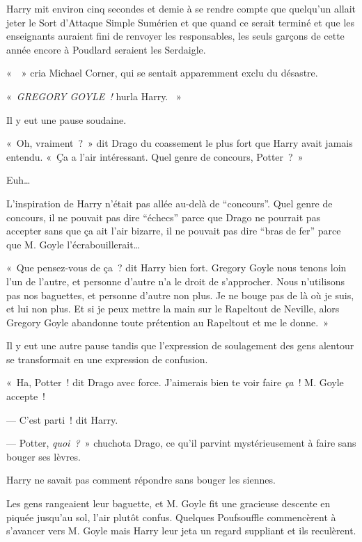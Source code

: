 Harry mit environ cinq secondes et demie à se rendre compte que quelqu'un allait jeter le Sort d'Attaque Simple Sumérien et que quand ce serait terminé et que les enseignants auraient fini de renvoyer les responsables, les seuls garçons de cette année encore à Poudlard seraient les Serdaigle.

«~~» cria Michael Corner, qui se sentait apparemment exclu du désastre.

«~\emph{GREGORY GOYLE~!} hurla Harry. ~»

Il y eut une pause soudaine.

«~Oh, vraiment~?~» dit Drago du coassement le plus fort que Harry avait jamais entendu. «~Ça a l'air intéressant. Quel genre de concours, Potter~?~»

Euh…

L'inspiration de Harry n'était pas allée au-delà de “concours”. Quel genre de concours, il ne pouvait pas dire “échecs” parce que Drago ne pourrait pas accepter sans que ça ait l'air bizarre, il ne pouvait pas dire “bras de fer” parce que M. Goyle l'écrabouillerait…

«~Que pensez-vous de ça~? dit Harry bien fort. Gregory Goyle nous tenons loin l'un de l'autre, et personne d'autre n'a le droit de s'approcher. Nous n'utilisons pas nos baguettes, et personne d'autre non plus. Je ne bouge pas de là où je suis, et lui non plus. Et si je peux mettre la main sur le Rapeltout de Neville, alors Gregory Goyle abandonne toute prétention au Rapeltout et me le donne.~»

Il y eut une autre pause tandis que l'expression de soulagement des gens alentour se transformait en une expression de confusion.

«~Ha, Potter~! dit Drago avec force. J'aimerais bien te voir faire \emph{ça}~! M. Goyle accepte~!

--- C'est parti~! dit Harry.

--- Potter, \emph{quoi~?}~» chuchota Drago, ce qu'il parvint mystérieusement à faire sans bouger ses lèvres.

Harry ne savait pas comment répondre sans bouger les siennes.

Les gens rangeaient leur baguette, et M. Goyle fit une gracieuse descente en piquée jusqu'au sol, l'air plutôt confus. Quelques Poufsouffle commencèrent à s'avancer vers M. Goyle mais Harry leur jeta un regard suppliant et ils reculèrent.

